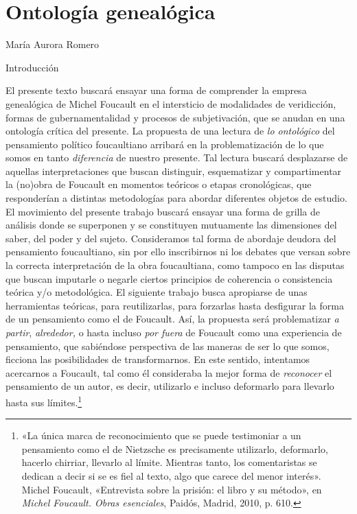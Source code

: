\chapter{Ontología genealógica}

María Aurora Romero

{Introducción}


El presente texto buscará ensayar una forma de comprender la empresa genealógica de Michel Foucault en el intersticio de modalidades de veridicción, formas de gubernamentalidad y procesos de subjetivación, que se anudan en una ontología crítica del presente. La propuesta de una lectura de \emph{lo ontológico} del pensamiento político foucaultiano arribará en la problematización de lo que somos en tanto \emph{diferencia} de nuestro presente. Tal lectura buscará desplazarse de aquellas interpretaciones que buscan distinguir, esquematizar y compartimentar la (no)obra de Foucault en momentos teóricos o etapas cronológicas, que responderían a distintas metodologías para abordar diferentes objetos de estudio. El movimiento del presente trabajo buscará ensayar una forma de grilla de análisis donde se superponen y se constituyen mutuamente las dimensiones del saber, del poder y del sujeto. Consideramos tal forma de abordaje deudora del pensamiento foucaultiano, sin por ello inscribirnos ni los debates que versan sobre la correcta interpretación de la obra foucaultiana, como tampoco en las disputas que buscan imputarle o negarle ciertos principios de coherencia o consistencia teórica y/o metodológica. El siguiente trabajo busca apropiarse de unas herramientas teóricas, para reutilizarlas, para forzarlas hasta desfigurar la forma de un pensamiento como el de Foucault. Así, la propuesta será problematizar \emph{a partir}, \emph{alrededor,} o hasta incluso \emph{por fuera} de Foucault como una experiencia de pensamiento, que sabiéndose perspectiva de las maneras de ser lo que somos, ficciona las posibilidades de transformarnos. En este sentido, intentamos acercarnos a Foucault, tal como él consideraba la mejor forma de \emph{reconocer} el pensamiento de un autor, es decir, utilizarlo e incluso deformarlo para llevarlo hasta sus límites.\footnote{«La única marca de reconocimiento que se puede testimoniar a un pensamiento como el de Nietzsche es precisamente utilizarlo, deformarlo, hacerlo chirriar, llevarlo al límite. Mientras tanto, los comentaristas se dedican a decir si se es fiel al texto, algo que carece del menor interés». Michel Foucault, «Entrevista sobre la prisión: el libro y su método», en \emph{Michel Foucault. Obras esenciales}, Paidós, Madrid, 2010, p. 610.}

